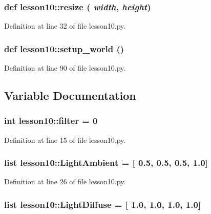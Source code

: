 \subsubsection{\setlength{\rightskip}{0pt plus 5cm}def lesson10::resize ( {\em width},  {\em height})}\label{namespacelesson10_a9b33adcd4e99204c6ba5286f8c5f604}




Definition at line 32 of file lesson10.py.
\subsubsection{\setlength{\rightskip}{0pt plus 5cm}def lesson10::setup\_\-world ()}\label{namespacelesson10_f10309551dc4aabb2ba667d8b539c720}




Definition at line 90 of file lesson10.py.

\subsection{Variable Documentation}
\subsubsection{\setlength{\rightskip}{0pt plus 5cm}int {\bf lesson10::filter} = 0\hspace{0.3cm}{\tt  [static]}}\label{namespacelesson10_e6b4520bcb50e4239e7529833f07722f}




Definition at line 15 of file lesson10.py.
\subsubsection{\setlength{\rightskip}{0pt plus 5cm}list {\bf lesson10::LightAmbient} = [ 0.5, 0.5, 0.5, 1.0]\hspace{0.3cm}{\tt  [static]}}\label{namespacelesson10_4b6e854a3a753caef38a7b5615ab51db}




Definition at line 26 of file lesson10.py.
\subsubsection{\setlength{\rightskip}{0pt plus 5cm}list {\bf lesson10::LightDiffuse} = [ 1.0, 1.0, 1.0, 1.0]\hspace{0.3cm}{\tt  [static]}}\label{namespacelesson10_c629beb9288d9f9871c72924aef957f3}




